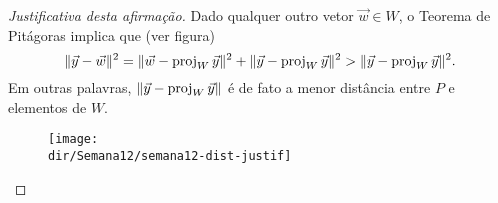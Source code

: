 \documentclass[../livro.tex]{subfiles}  %
\providecommand{\dir}{..}
\begin{document}
\begin{proof}[Justificativa desta afirmação]
Dado qualquer outro vetor $\vec{w} \in W$, o Teorema de Pitágoras implica que (ver figura)
\begin{equation}
\| \vec{y} - \vec{w} \|^2 = \| \vec{w} - \operatorname{proj}_{W} \vec{y}\|^2 + \| \vec{y} - \operatorname{proj}_{W} \vec{y}\|^2 > \| \vec{y} - \operatorname{proj}_{W} \vec{y}\|^2.
\end{equation} Em outras palavras, $\|\vec{y} - \operatorname{proj}_{W} \vec{y}\|$ é de fato a menor distância entre $P$ e elementos de $W$.
\begin{figure}[h!]
\begin{center}
\texttt{[image: \\dir/Semana12/semana12-dist-justif]}
\end{center}
\end{figure}
\end{proof}
\end{document}
